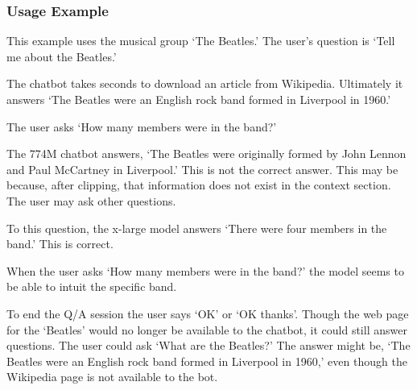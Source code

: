 \subsubsection{Usage Example}

This example uses the musical group `The Beatles.' The user's question is `Tell me about the Beatles.'

The chatbot takes seconds to download an article from Wikipedia. Ultimately it answers `The Beatles were an English rock band formed in Liverpool in 1960.'

The user asks `How many members were in the band?'

The 774M chatbot answers, `The Beatles were originally formed by John Lennon and Paul McCartney in Liverpool.' This is not the correct answer. This may be because, after clipping, that information does not exist in the context section. The user may ask other questions. %

To this question, the x-large model answers `There were four members in the band.' This is correct.

When the user asks `How many members were in the band?' the model seems to be able to intuit the specific band. %

To end the Q/A session the user says `OK' or `OK thanks'. Though the web page for the `Beatles' would no longer be available to the chatbot, it could still answer questions. The user could ask `What are the Beatles?' The answer might be, `The Beatles were an English rock band formed in Liverpool in 1960,' even though the Wikipedia page is not available to the bot.



